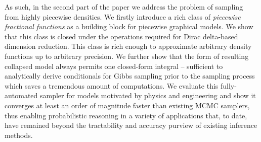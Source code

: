 As such, in the second part of the paper we address the problem of sampling from highly piecewise densities. %
We firstly introduce a rich class of \emph{piecewise fractional functions} as a building block for piecewise graphical models.%
We show that this class is closed under the operations required for Dirac delta-based dimension reduction.
This class is rich enough to approximate arbitrary density functions up to arbitrary precision. 
We further show that the form of resulting collapsed model always permits one closed-form integral -- sufficient to analytically derive conditionals for Gibbs sampling prior to the sampling process which saves a tremendous amount of computations.
We evaluate this fully-automated sampler for models motivated by physics and engineering and show it converges at least an order of magnitude faster than existing MCMC samplers, thus enabling probabilistic reasoning in a variety of applications that, to date, have remained beyond the tractability and accuracy purview of existing inference methods.  




